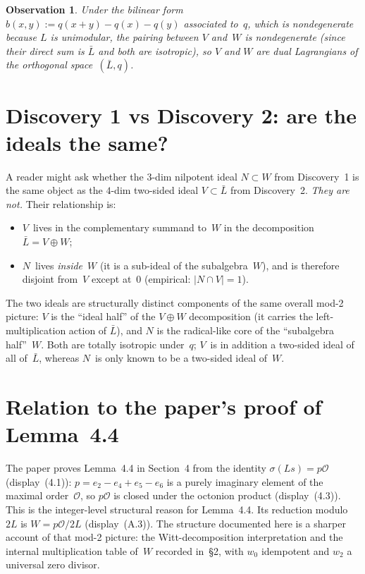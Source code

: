 \documentclass[11pt]{amsart}
\newtheorem*{observation}{Observation}
\begin{document}
\begin{observation}
Under the bilinear form
$b(x, y) := q(x+y) - q(x) - q(y)$ associated to~$q$, which is
nondegenerate because $L$ is unimodular, the pairing between $V$
and~$W$ is nondegenerate (since their direct sum is $\bar L$ and both
are isotropic), so $V$ and $W$ are dual Lagrangians
of the orthogonal space~$(\bar L, q)$.
\end{observation}

\section{Discovery 1 vs Discovery 2: are the ideals the same?}

A reader might ask whether the
$3$-dim nilpotent ideal $N \subset W$ from Discovery~1 is the same
object as the $4$-dim two-sided ideal $V \subset \bar L$ from
Discovery~2. \emph{They are not.} Their relationship is:

\begin{itemize}
\item $V$~lives in the complementary summand to~$W$ in the
  decomposition $\bar L = V \oplus W$;
\item $N$~lives \emph{inside}~$W$ (it is a sub-ideal of the
  subalgebra~$W$), and is therefore disjoint from~$V$ except at~$0$
  (empirical: $|N \cap V| = 1$).
\end{itemize}

The two ideals are structurally distinct components of the same
overall mod-2 picture: $V$ is the ``ideal half'' of the
$V \oplus W$ decomposition (it carries the left-multiplication
action of $\bar L$), and $N$ is the radical-like core of the
``subalgebra half''~$W$. Both are totally isotropic under~$q$;
$V$~is in addition a two-sided ideal of all of~$\bar L$, whereas
$N$~is only known to be a two-sided ideal of~$W$.

\section{Relation to the paper's proof of Lemma~4.4}

The paper proves Lemma~4.4 in Section~4 from the identity
$\sigma(Ls) = p\mathcal O$ (display~(4.1)): $p = e_2 - e_4 + e_5 - e_6$
is a purely imaginary element of the maximal order~$\mathcal O$, so
$p\mathcal O$ is closed under the octonion product (display~(4.3)). This
is the integer-level structural reason for Lemma~4.4. Its reduction
modulo~$2L$ is $W = p\mathcal O/2L$ (display~(A.3)). The structure
documented here is a sharper account of that mod-2 picture: the
Witt-decomposition interpretation and the internal multiplication table
of~$W$ recorded in~\S2, with $w_0$ idempotent and $w_2$ a universal zero
divisor.
\end{document}
